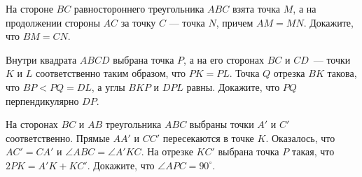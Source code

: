 \begin{problems}
\item На стороне $BC$ равностороннего треугольника $ABC$ взята точка $M$, а на продолжении стороны $AC$ за точку 
$C$ --- точка $N$, причем $AM=MN$. Докажите, что $BM=CN$.

\item Внутри квадрата $ABCD$ выбрана точка $P$, а на его сторонах $BC$ и $CD$~--- точки $K$ и $L$ соответственно таким образом, что $PK = PL$. Точка $Q$ отрезка $BK$ такова, что $BP < PQ = DL$, а углы $BKP$ и $DPL$ равны. Докажите, что $PQ$ перпендикулярно $DP$.

\item На сторонах $BC$ и $AB$ треугольника $ABC$ выбраны точки $A'$ и $C'$ соответственно. Прямые $AA'$ и $CC'$ пересекаются в точке $K$. Оказалось, что $AC'=CA'$ и $\angle ABC=\angle A'KC$. На отрезке $KC'$ выбрана точка $P$ такая, что $2PK=A'K+KC'$. Докажите, что $\angle APC=90^{\circ}$.

\end{problems}
